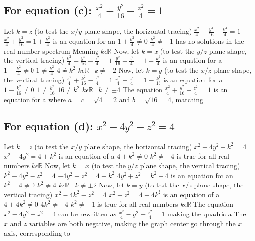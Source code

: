 \documentclass{article}
\begin{document}
\begin{multicols*}{2}
\subsection*{For equation (c): $ \frac{x^2}{4}+\frac{y^2}{16}-\frac{z^2}{4}=1$} 
Let $k=z$ (to test the $x/y$ plane shape, the horizontal tracing)
\vfill$ \frac{x^2}{4}+\frac{y^2}{16}-\frac{k^2}{4}=1$
\vfill$ \frac{x^2}{4}+\frac{y^2}{16}=1+\frac{k^2}{4}$ is an equation for an 
\vfill$ 1+\frac{k^2}{4}\neq 0$
\vfill$ \frac{k^2}{4}\neq -1$ has no solutions in the real number spectrum
\vfill Meaning $k \epsilon \mathbb{R} $
\vfill Now, let $k=x$ (to test the $y/z$ plane shape, the vertical tracing)
\vfill$ \frac{k^2}{4}+\frac{y^2}{16}-\frac{z^2}{4}=1$
\vfill$ \frac{y^2}{16}-\frac{z^2}{4}=1-\frac{k^2}{4}$ is an equation for a 
\vfill$ 1-\frac{k^2}{4}\neq 0$
\vfill$ 1 \neq \frac{k^2}{4}$
\vfill$ 4 \neq k^2$
\vfill$ k \epsilon \mathbb{R} \;\;\; k \neq \pm 2$
\vfill Now, let $k=y$ (to test the $x/z$ plane shape, the vertical tracing)
\vfill$ \frac{x^2}{4}+\frac{k^2}{16}-\frac{z^2}{4}=1$
\vfill$ \frac{x^2}{4}-\frac{z^2}{4}=1-\frac{k^2}{16}$ is an equation for a 
\vfill$ 1-\frac{k^2}{16} \neq 0$
\vfill$ 1 \neq \frac{k^2}{16} $
\vfill$ 16 \neq {k^2} $
\vfill$ k \epsilon \mathbb{R} \;\;\; k \neq \pm 4 $
\vfill The equation $ \frac{x^2}{4}+\frac{y^2}{16}-\frac{z^2}{4}=1$ is an equation for a  where $a=c=\sqrt{4} = 2$ and $b=\sqrt{16}=4$, matching \\[1in]
\vfill\null
\columnbreak
\subsection*{For equation (d): $ x^2-4y^2-z^2=4$}
Let $k=z$ (to test the $x/y$ plane shape, the horizontal tracing)
\vfill $ x^2-4y^2-k^2=4$
\vfill $ x^2-4y^2=4+k^2$ is an equation of a 
\vfill $ 4+k^2 \neq 0$ 
\vfill $ k^2 \neq -4$ is true for all real numbers
\vfill$ k \epsilon \mathbb{R}$
\vfill Now, let $k=x$ (to test the $y/z$ plane shape, the vertical tracing)
\vfill $ k^2-4y^2-z^2=4$
\vfill $ -4y^2-z^2=4-k^2$
\vfill $ 4y^2+z^2=k^2-4$ is an equation for an 
\vfill $ k^2-4 \neq 0$
\vfill $ k^2 \neq 4$
\vfill $ k \epsilon \mathbb{R}\;\;\; k \neq \pm 2$
\vfill Now, let $k=y$ (to test the $x/z$ plane shape, the vertical tracing)
\vfill $ x^2-4k^2-z^2=4$
\vfill $ x^2-z^2=4+4k^2$ is an equation of a 
\vfill $ 4+4k^2 \neq 0$
\vfill $ 4k^2 \neq -4$
\vfill $ k^2 \neq -1$ is true for all real numbers
\vfill$ k \epsilon \mathbb{R}$
\vfill The equation $ x^2-4y^2-z^2=4$ can be rewritten as $ \frac{x^2}{4}-y^2-\frac{z^2}{4}=1$ making the quadric a  The $x$ and $z$ variables are both negative, making the graph center go through the $x$ axis, corresponding to \\[1in]
\end{multicols*}
\end{document}
